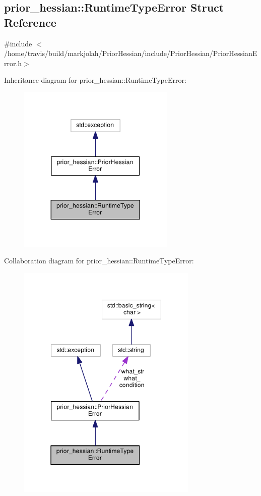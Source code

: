 \hypertarget{structprior__hessian_1_1RuntimeTypeError}{}\subsection{prior\+\_\+hessian\+:\+:Runtime\+Type\+Error Struct Reference}
\label{structprior__hessian_1_1RuntimeTypeError}


{\ttfamily \#include $<$/home/travis/build/markjolah/\+Prior\+Hessian/include/\+Prior\+Hessian/\+Prior\+Hessian\+Error.\+h$>$}



Inheritance diagram for prior\+\_\+hessian\+:\+:Runtime\+Type\+Error\+:\nopagebreak
\begin{figure}[H]
\begin{center}
\leavevmode
\includegraphics[width=212pt]{structprior__hessian_1_1RuntimeTypeError__inherit__graph}
\end{center}
\end{figure}


Collaboration diagram for prior\+\_\+hessian\+:\+:Runtime\+Type\+Error\+:\nopagebreak
\begin{figure}[H]
\begin{center}
\leavevmode
\includegraphics[width=244pt]{structprior__hessian_1_1RuntimeTypeError__coll__graph}
\end{center}
\end{figure}
